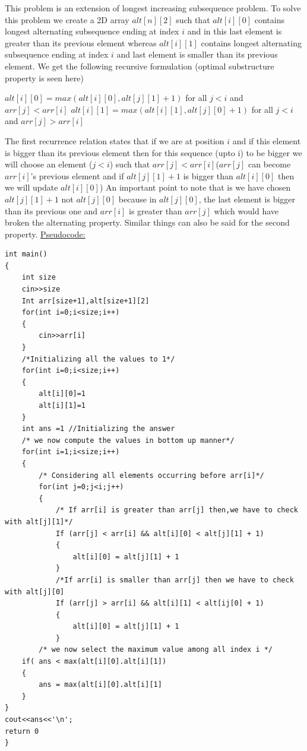 \documentclass[12pt]{book}
\begin{document}
This problem is an extension of longest increasing subsequence problem. To solve this problem we create a 2D array $alt[n][2]$ such that $alt[i][0]$ contains longest alternating subsequence ending at index $i$ and in this last element is greater than its previous element whereas $alt[i][1]$ contains longest alternating subsequence ending at index $i$ and last element is smaller than its previous element.\newline
We get the following recursive formulation (optimal substructure property is seen here)\newline
\begin{center}
$alt[i][0] = max(alt[i][0], alt[j][1]+1)$ for all $j < i$ and $arr[j] < arr[i]$\newline\newline
$alt[i][1] = max(alt[i][1], alt[j][0]+1)$ for all $j < i$ and $arr[j] > arr[i]$\newline\newline
\end{center}
The first recurrence relation states that if we are at position $i$ and if this element is bigger than its previous element then for this sequence (upto i) to be bigger we will choose an element ($j < i$) such that $arr[j] < arr[i]$($arr[j]$ can become $arr[i]$’s previous element and if $alt[j][1]+1$ is bigger than $alt[i][0]$ then we will update $alt[i][0]$)\newline\newline
An important point to note that is we have chosen $alt[j][1]+1$ not $alt[j][0]$ because in $alt[j][0]$, the last element is bigger than its previous one and $arr[i]$ is greater than $arr[j]$ which would have broken the alternating property.\newline\newline
Similar things can also be said for the second property.\newline\newline
\underline{Pseudocode:}\newline
\begin{lstlisting}
int main()
{
	int size
	cin>>size
	Int arr[size+1],alt[size+1][2]
	for(int i=0;i<size;i++)
	{
		cin>>arr[i]
	}
	/*Initializing all the values to 1*/
	for(int i=0;i<size;i++)
	{
		alt[i][0]=1
		alt[i][1]=1
	}
	int ans =1 //Initializing the answer
	/* we now compute the values in bottom up manner*/
	for(int i=1;i<size;i++)
	{	
		/* Considering all elements occurring before arr[i]*/
		for(int j=0;j<i;j++)
		{
			/* If arr[i] is greater than arr[j] then,we have to check with alt[j][1]*/
			If (arr[j] < arr[i] && alt[i][0] < alt[j][1] + 1)
			{
				alt[i][0] = alt[j][1] + 1
			}
			/*If arr[i] is smaller than arr[j] then we have to check with alt[j][0]
			If (arr[j] > arr[i] && alt[i][1] < alt[ij[0] + 1)
			{
				alt[i][0] = alt[j][1] + 1
			}
		/* we now select the maximum value among all index i */
	if( ans < max(alt[i][0].alt[i][1])
	{
		ans = max(alt[i][0].alt[i][1]
	}
}
cout<<ans<<'\n';
return 0
}
\end{lstlisting}
\end{document}
